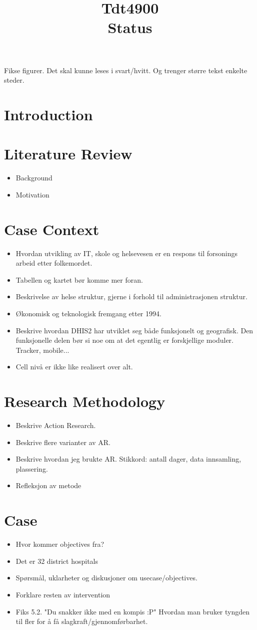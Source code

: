 \documentclass{article}
\title{Tdt4900 \\ Status}
\begin{document}
Fikse figurer. Det skal kunne leses i svart/hvitt. Og trenger større tekst enkelte steder.

\section{Introduction}

\section{Literature Review}
\begin{itemize}
\item Background
\item Motivation
\end{itemize}
\section{Case Context}
\begin{itemize}
\item Hvordan utvikling av IT, skole og helsevesen er en respons til forsonings arbeid etter folkemordet.
\item Tabellen og kartet bør komme mer foran.
\item Beskrivelse av helse struktur, gjerne i forhold til administrasjonen struktur.
\item Økonomisk og teknologisk fremgang etter 1994.
\item Beskrive hvordan DHIS2 har utviklet seg både funksjonelt og geografisk. Den funksjonelle delen bør si noe om at det egentlig er forskjellige moduler. Tracker, mobile...
\item Cell nivå er ikke like realisert over alt.
\end{itemize}
\section{Research Methodology}
\begin{itemize}
\item Beskrive Action Research.
\item Beskrive flere varianter av AR.
\item Beskrive hvordan jeg brukte AR. Stikkord: antall dager, data innsamling, plassering.
\item Refleksjon av metode 
\end{itemize}
\section{Case}
\begin{itemize}
\item Hvor kommer objectives fra?
\item Det er 32 district hospitals
\item Spørsmål, uklarheter og diskusjoner om usecase/objectives.
\item Forklare resten av intervention
\item Fiks 5.2. "Du snakker ikke med en kompis :P" Hvordan man bruker tyngden til fler for å få slagkraft/gjennomførbarhet.
\end{itemize}
\end{document}
